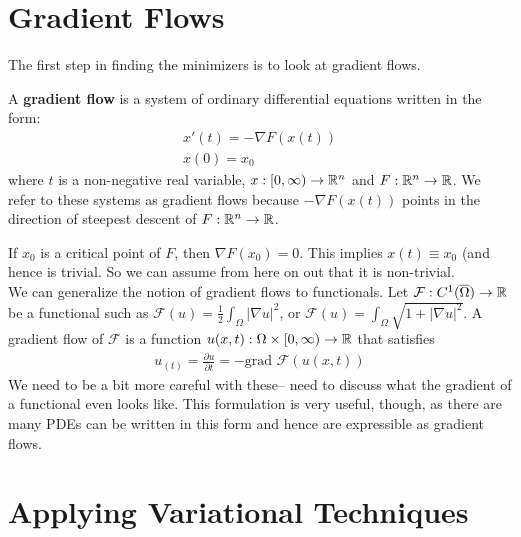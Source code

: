 \documentclass{memoir}
\begin{document}
\section{Gradient Flows}
\label{sec:gradient_flows}

The first step in finding the minimizers is to look at gradient flows. 

\begin{defn}
A \textbf{gradient flow} is a system of ordinary differential equations written in the form:
\begin{align*}
	x'(t) = -\nabla F(x(t))\\
	x(0) = x_0
\end{align*}
where \(t\) is a non-negative real variable, \(x:[0,\infty) \to \mathbb{R}^{n}\) and \(F:\mathbb{R}^{n}\to \mathbb{R}\). We refer to these systems as gradient flows because \(-\nabla F(x(t))\) points in the direction of steepest descent of \(F:\mathbb{R}^{n}\to \mathbb{R}\).
\end{defn}

%     

If \(x_0\) is a critical point of \(F\), then \(\nabla F(x_0) = 0\). This implies \(x(t) \equiv x_0\) (and hence is trivial. So we can assume from here on out that it is non-trivial.\\

We can generalize the notion of gradient flows to functionals. Let \(\mathcal{F}:C^{1}(\overline{\Omega }) \to \mathbb{R}\) be a functional such as \(\mathcal{F}(u) = \frac{1}{2} \int_\Omega \left| \nabla u \right|^2\), or \(\mathcal{F}(u) = \int_\Omega \sqrt{1+\left| \nabla u \right|^2} \). A gradient flow of \(\mathcal{F}\) is a function \(u(x,t):\Omega \times [0,\infty)\to \mathbb{R}\) that satisfies
\begin{align*}
	u_{(t)} = \frac{\partial u}{\partial t} = - \textrm{grad }\mathcal{F}(u(x,t))
\end{align*}
We need to be a bit more careful with these-- need to discuss what the gradient of a functional even looks like. This formulation is very useful, though, as there are many PDEs can be written in this form and hence are expressible as gradient flows.

\section{Applying Variational Techniques}
\label{sec:applying_variational_techniques}
\end{document}
